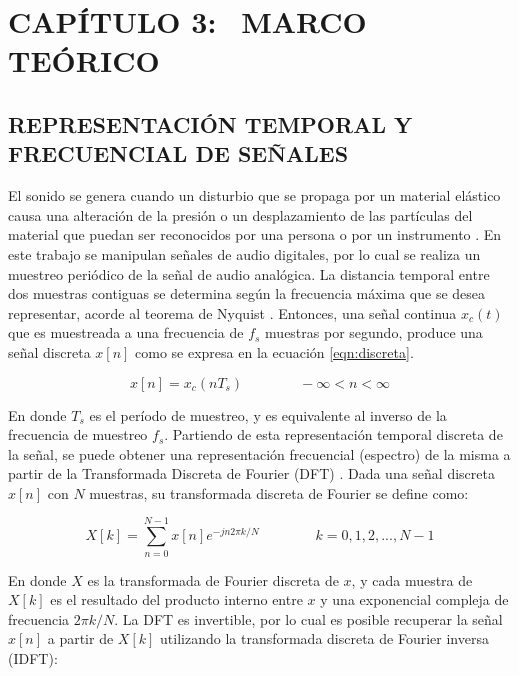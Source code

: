 \section[Marco Teórico]{CAPÍTULO 3:$\ \ \ \ $MARCO TEÓRICO} 

\subsection[Representación temporal y frecuencial de señales]{REPRESENTACIÓN TEMPORAL Y FRECUENCIAL DE SEÑALES}

El sonido se genera cuando un disturbio que se propaga por un
material elástico causa una alteración de la presión o un desplazamiento
de las partículas del material que puedan ser reconocidos por una persona o por un instrumento \cite{Beranek}. 
En este trabajo se manipulan señales de audio digitales, por lo cual se realiza un muestreo periódico de la señal de audio analógica. La distancia temporal entre dos muestras contiguas se determina según la frecuencia máxima que se desea representar, acorde al teorema de Nyquist \cite{openheim}. Entonces, una señal continua $x_{c}(t)$ que es muestreada a una frecuencia de $f_{s}$ muestras por segundo, produce una señal discreta $x[n]$ como se expresa en la ecuación \ref{eqn:discreta}.

\begin{equation}
\label{eqn:discreta}
	x[n] = x_{c}(nT_{s}) \qquad \qquad -\infty < n < \infty
\end{equation} 

En donde $T_{s}$ es el período de muestreo, y es equivalente al inverso de la frecuencia de muestreo $f_{s}$.
Partiendo de esta representación temporal discreta de la señal, se puede obtener una representación frecuencial (espectro) de la misma a partir de la Transformada Discreta de Fourier (DFT) \cite{openheim}. 
Dada una señal discreta $x[n]$ con $N$ muestras, su transformada discreta de Fourier se define como:

\begin{equation}
\label{eqn:DFT}
	X[k] = \sum_{n=0}^{N-1} x[n]e^{-jn2 \pi k/N} \qquad \qquad  k = 0, 1, 2,..., N-1
\end{equation} 

En donde $X$ es la transformada de Fourier discreta de $x$, y cada muestra de $X[k]$ es el resultado del producto interno entre $x$ y una exponencial compleja de frecuencia $2 \pi k/N$. La DFT es invertible, por lo cual es posible recuperar la señal $x[n]$ a partir de $X[k]$ utilizando la transformada discreta de Fourier inversa (IDFT):

